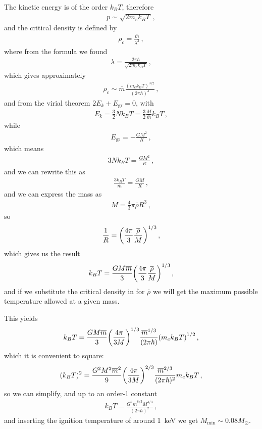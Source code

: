 \documentclass[main.tex]{subfiles}
\begin{document}
The kinetic energy is of the order \(k_B T\), therefore 
%
\begin{align}
  p \sim \sqrt{2 m_e k_B T}
\,,
\end{align}
%
and the critical density is defined by 
%
\begin{align}
  \rho_c = \frac{\overline{m}}{\lambda^3}
\,,
\end{align}
%
where from the formula we found 
%
\begin{align}
  \lambda = \frac{2 \pi \hbar}{\sqrt{2 m_e k_B T}}
\,,
\end{align}
%
which gives approximately 
%
\begin{align}
  \rho _c \sim \overline{m} \frac{(m_e k_B T)^{3/2}}{(2 \pi \hbar)^{3}}
\,,
\end{align}
%
and from the virial theorem \(2 E_k + E _{\text{gr}}=0\), with 
%
\begin{align}
  E_k = \frac{3}{2} N k_B T = \frac{3}{2} \frac{M}{\overline{m}} k_B T
\,,
\end{align}
%
while 
%
\begin{align}
  E _{\text{gr}} = - \frac{G M^2}{R}
\,,
\end{align}
%
which means 
%
\begin{align}
  3 N k_B T = \frac{GM^2}{R}
\,,
\end{align}
%
and we can rewrite this as 
%
\begin{align}
  \frac{3 k_B T}{\overline{m}} = \frac{GM}{R}
\,,
\end{align}
%
and we can express the mass as 
%
\begin{align}
  M = \frac{4}{3} \pi \overline{\rho} R^3
\,,
\end{align}
%
so 
%
\begin{align}
  \frac{1}{R} = \qty(\frac{4 \pi }{3} \frac{\overline{\rho}}{M})^{1/3}
\,,
\end{align}
%
which gives us the result 
%
\begin{align}
  k_B T = \frac{GM \overline{m}}{3} \qty(\frac{4 \pi }{3} \frac{\overline{\rho}}{M})^{1/3}
\,,
\end{align}
%
and if we substitute the critical density in for \(\overline{\rho}\) we will get the maximum possible temperature allowed at a given mass. 

This yields
%
\begin{align}
  k_B T = \frac{GM \overline{m}}{3} \qty(\frac{4 \pi }{3 M})^{1/3} \frac{\overline{m}^{1/3}}{(2 \pi \hbar)} \qty(m_e k_B T)^{1/2}
\,,
\end{align}
%
which it is convenient to square: 
%
\begin{align}
  (k_B T)^2 = \frac{G^2M^2 \overline{m}^2}{9}
  \qty(\frac{4 \pi }{3 M})^{2/3} \frac{\overline{m}^{2/3}}{(2 \pi \hbar)^2} m_e k_B T 
\,,
\end{align}
%
so we can simplify, and up to an order-1 constant 
%
\begin{align}
  k_B T = \frac{G^2 \overline{m}^{8/3} M^{4/3}}{(2 \pi \hbar)^2} 
\,,
\end{align}
%
and inserting the ignition temperature of around \SI{1}{keV} we get \(M _{\text{min}} \sim 0.08 M_{\odot}\). 
\end{document}
